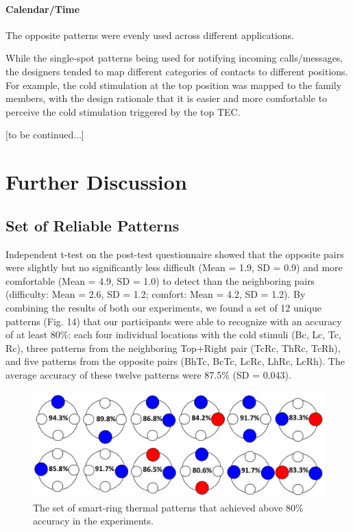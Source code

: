 \documentclass[preprint,12pt]{elsarticle}
\begin{document}
\paragraph{Calendar/Time}


The opposite patterns were evenly used across different applications.

While the single-spot patterns being used for notifying incoming calls/messages, the designers tended to map different categories of contacts to different positions. For example, the cold stimulation at the top position was mapped to the family members, with the design rationale that it is easier and more comfortable to perceive the cold stimulation triggered by the top TEC.

[to be continued...]

\section{Further Discussion}
\subsection{Set of Reliable Patterns}
Independent t-test on the post-test questionnaire showed that the opposite pairs were slightly but no significantly less difficult (Mean = 1.9, SD = 0.9) and more comfortable (Mean = 4.9, SD = 1.0) to detect than the neighboring pairs (difficulty: Mean = 2.6, SD = 1.2; comfort: Mean = 4.2, SD = 1.2). By combining the results of both our experiments, we found a set of 12 unique patterns (Fig. 14) that our participants were able to recognize with an accuracy of at least 80\%: each four individual locations with the cold stimuli (Bc, Lc, Tc, Rc), three patterns from the neighboring Top+Right pair (TcRc, ThRc, TcRh), and five patterns from the opposite pairs (BhTc, BcTc, LcRc, LhRc, LcRh). The average accuracy of these twelve patterns were 87.5\% (SD = 0.043).


\begin{figure}[tp]
  \centering
  \includegraphics[width=0.9\columnwidth]{img/fig14.png}
  \caption{The set of smart-ring thermal patterns that achieved above 80\% accuracy in the experiments.}
  \label{fig:14}
\end{figure}
\end{document}
